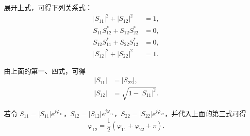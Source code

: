 展开上式，可得下列关系式：
\[
\begin{aligned}
	|S_{11}|^2 + |S_{12}|^2 &= 1, \\
	S_{11} S_{12}^* + S_{12} S_{22}^* &= 0, \\
	S_{12} S_{11}^* + S_{22} S_{12}^* &= 0, \\
	|S_{12}|^2 + |S_{22}|^2 &= 1.
\end{aligned}
\]

由上面的第一、四式，可得
\[
\begin{aligned}
	|S_{11}| &= |S_{22}|, \\
	|S_{12}| &= \sqrt{1 - |S_{11}|^2}.
\end{aligned}
\tag{4-4-12a}
\]

若令 $ S_{11} = |S_{11}| e^{j\varphi_{11}} $，$ S_{12} = |S_{12}| e^{j\varphi_{12}} $，$ S_{22} = |S_{22}| e^{j\varphi_{22}} $，并代入上面的第三式可得
\[
\varphi_{12} = \frac{1}{2} (\varphi_{11} + \varphi_{22} \pm \pi).
\tag{4-4-12b}
\]